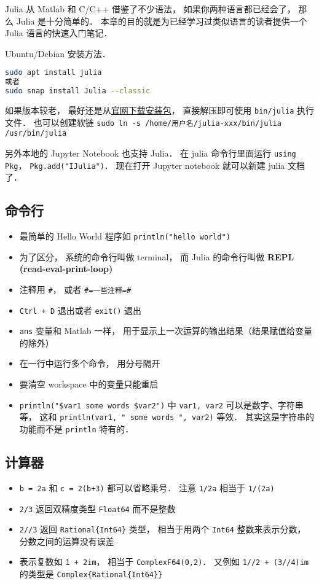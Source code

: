 
\begin{issues}
\issueDraft
\end{issues}

Julia 从 Matlab 和 C/C++ 借鉴了不少语法， 如果你两种语言都已经会了， 那么 Julia 是十分简单的． 本章的目的就是为已经学习过类似语言的读者提供一个 Julia 语言的快速入门笔记．

Ubuntu/Debian 安装方法．
\begin{lstlisting}[language=bash]
sudo apt install julia
或者
sudo snap install Julia --classic
\end{lstlisting}
如果版本较老， 最好还是从\href{https://julialang.org/downloads}{官网下载安装包}， 直接解压即可使用 \verb|bin/julia| 执行文件． 也可以创建软链 \verb|sudo ln -s /home/用户名/julia-xxx/bin/julia /usr/bin/julia|

另外本地的 Jupyter Notebook 也支持 Julia． 在 julia 命令行里面运行 \verb|using Pkg|， \verb|Pkg.add("IJulia")|． 现在打开 Jupyter notebook 就可以新建 julia 文档了．

\subsection{命令行}
\begin{itemize}
\item 最简单的 Hello World 程序如 \verb|println("hello world")|

\item 为了区分， 系统的命令行叫做 terminal， 而 Julia 的命令行叫做 \textbf{REPL (read-eval-print-loop)}
\item 注释用 \verb|#|， 或者 \verb|#=一些注释=#|
\item \verb|Ctrl + D| 退出或者 \verb|exit()| 退出
\item \verb|ans| 变量和 Matlab 一样， 用于显示上一次运算的输出结果（结果赋值给变量的除外）
\item 在一行中运行多个命令， 用分号隔开
\item 要清空 workspace 中的变量只能重启
\item \verb|println("$var1 some words $var2")| 中 \verb|var1, var2| 可以是数字、字符串等， 这和 \verb|println(var1, " some words ", var2)| 等效． 其实这是字符串的功能而不是 \verb|println| 特有的．
\end{itemize}

\subsection{计算器}
\begin{itemize}
\item \verb|b = 2a| 和 \verb|c = 2(b+3)| 都可以省略乘号． 注意 \verb|1/2a| 相当于 \verb|1/(2a)|
\item \verb|2/3| 返回双精度类型 \verb|Float64| 而不是整数
\item \verb|2//3| 返回 \verb|Rational{Int64}| 类型， 相当于用两个 \verb|Int64| 整数来表示分数， 分数之间的运算没有误差
\item 表示复数如 \verb|1 + 2im|， 相当于 \verb|ComplexF64(0,2)|． 又例如 \verb|1//2 + (3//4)im| 的类型是 \verb|Complex{Rational{Int64}}|
\end{itemize}


